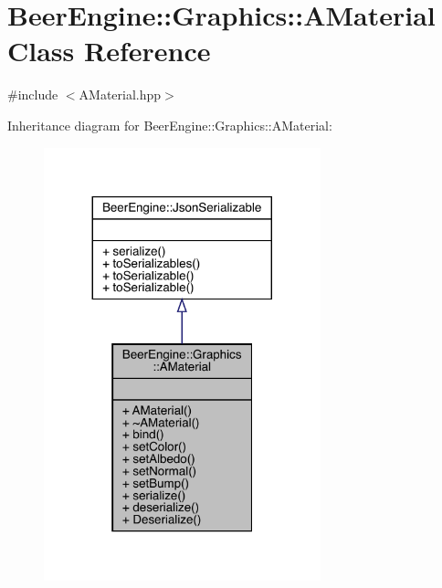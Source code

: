 \hypertarget{class_beer_engine_1_1_graphics_1_1_a_material}{}\section{Beer\+Engine\+:\+:Graphics\+:\+:A\+Material Class Reference}
\label{class_beer_engine_1_1_graphics_1_1_a_material}


{\ttfamily \#include $<$A\+Material.\+hpp$>$}



Inheritance diagram for Beer\+Engine\+:\+:Graphics\+:\+:A\+Material\+:\nopagebreak
\begin{figure}[H]
\begin{center}
\leavevmode
\includegraphics[width=227pt]{class_beer_engine_1_1_graphics_1_1_a_material__inherit__graph}
\end{center}
\end{figure}


